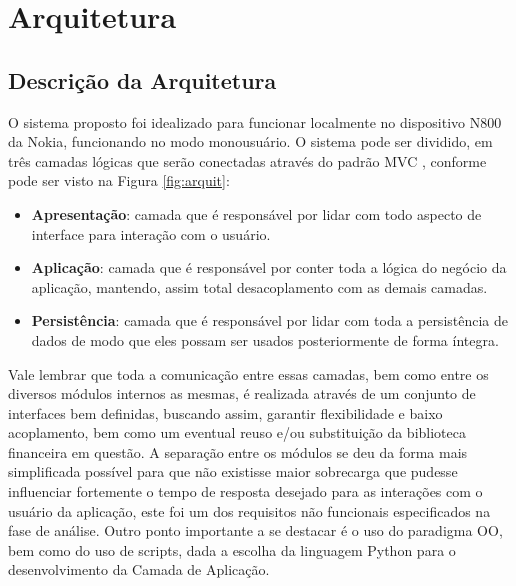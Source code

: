 \chapter{Arquitetura}


\section{Descrição da Arquitetura}

O sistema proposto foi idealizado para funcionar localmente no dispositivo N800 da Nokia, funcionando no modo monousuário. O sistema pode ser dividido, em três camadas lógicas que serão conectadas através do padrão MVC \cite{mvc}, conforme pode ser visto na Figura \ref{fig:arquit}:
\begin{itemize}
 \item \textbf{Apresentação}: camada que é responsável por lidar com todo aspecto de interface para interação com o usuário.
 \item \textbf{Aplicação}: camada que é responsável por conter toda a lógica do negócio da aplicação, mantendo, assim total desacoplamento com as demais camadas.
 \item \textbf{Persistência}: camada que é responsável por lidar com toda a persistência de dados de modo que eles possam ser usados posteriormente de forma íntegra.
\end{itemize}

Vale lembrar que toda a comunicação entre essas camadas, bem como entre os diversos módulos internos as mesmas, é realizada através de um conjunto de interfaces bem definidas, buscando assim, garantir flexibilidade e baixo acoplamento, bem como um eventual reuso e/ou substituição da biblioteca financeira em questão. A separação entre os módulos se deu da forma mais simplificada possível para que não existisse maior sobrecarga que pudesse influenciar fortemente o tempo de resposta desejado para as interações com o usuário da aplicação, este foi um dos requisitos não funcionais especificados na fase de análise.
Outro ponto importante a se destacar é o uso do paradigma OO, bem como do uso de scripts, dada a escolha da linguagem Python para o desenvolvimento da Camada de Aplicação.

